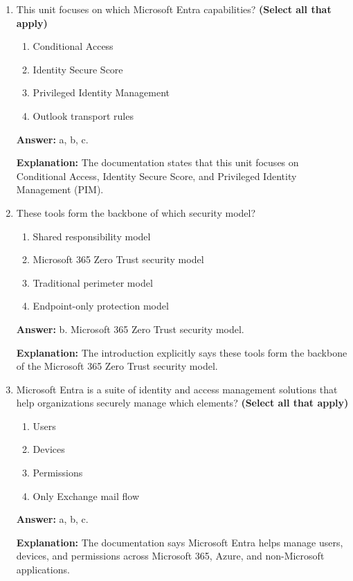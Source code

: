 \documentclass[10pt]{article}
\begin{document}
\begin{enumerate}[leftmargin=*]

\item This unit focuses on which Microsoft Entra capabilities? \textbf{(Select all that apply)}
\begin{enumerate}[label=\alph*., leftmargin=1.5em]
\item Conditional Access
\item Identity Secure Score
\item Privileged Identity Management
\item Outlook transport rules
\end{enumerate}
\textbf{Answer:} a, b, c.

\textbf{Explanation:} The documentation states that this unit focuses on Conditional Access, Identity Secure Score, and Privileged Identity Management (PIM).

\item These tools form the backbone of which security model?
\begin{enumerate}[label=\alph*., leftmargin=1.5em]
\item Shared responsibility model
\item Microsoft 365 Zero Trust security model
\item Traditional perimeter model
\item Endpoint-only protection model
\end{enumerate}
\textbf{Answer:} b. Microsoft 365 Zero Trust security model.

\textbf{Explanation:} The introduction explicitly says these tools form the backbone of the Microsoft 365 Zero Trust security model.

\item Microsoft Entra is a suite of identity and access management solutions that help organizations securely manage which elements? \textbf{(Select all that apply)}
\begin{enumerate}[label=\alph*., leftmargin=1.5em]
\item Users
\item Devices
\item Permissions
\item Only Exchange mail flow
\end{enumerate}
\textbf{Answer:} a, b, c.

\textbf{Explanation:} The documentation says Microsoft Entra helps manage users, devices, and permissions across Microsoft 365, Azure, and non-Microsoft applications.


\end{enumerate}
\end{document}
